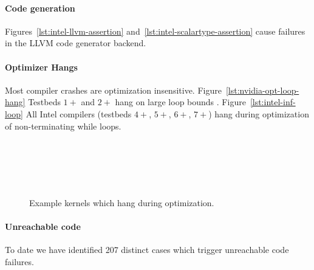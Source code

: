 \paragraph{Code generation} Figures~\ref{lst:intel-llvm-assertion} and~\ref{lst:intel-scalartype-assertion} cause failures in the LLVM code generator backend.


\paragraph{Optimizer Hangs} Most compiler crashes are optimization insensitive.  Figure~\ref{lst:nvidia-opt-loop-hang} Testbeds $1+$ and $2+$ hang on large loop bounds . Figure~\ref{lst:intel-inf-loop} All Intel compilers (testbeds $4+$, $5+$, $6+$, $7+$) hang during optimization of non-terminating while loops.

\begin{figure}
  \centering %
  \\%
  \\%
  \\%
  \\%
  \caption{Example kernels which hang during optimization.}%
  \label{lst:compiler-hangs}%
\end{figure}


\paragraph{Unreachable code} To date we have identified 207 distinct cases which trigger unreachable code failures. 


